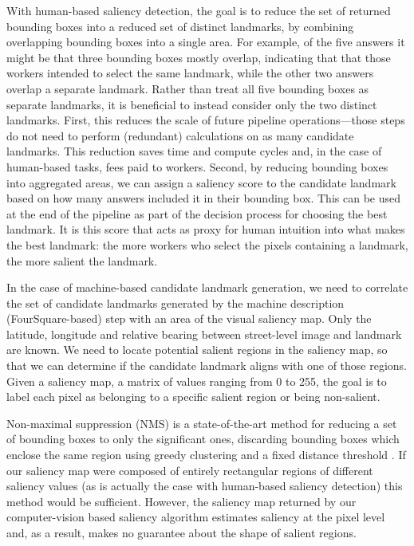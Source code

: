 With human-based saliency detection, the goal is to reduce the set of returned bounding boxes into a reduced set of distinct landmarks, by combining overlapping bounding boxes into a single area. For example, of the five answers it might be that three bounding boxes mostly overlap, indicating that that those workers intended to select the same landmark, while the other two answers overlap a separate landmark. Rather than treat all five bounding boxes as separate landmarks, it is beneficial to instead consider only the two distinct landmarks. First, this reduces the scale of future pipeline operations---those steps do not need to perform (redundant) calculations on as many candidate landmarks. This reduction saves time and compute cycles and, in the case of human-based tasks, fees paid to workers. Second, by reducing bounding boxes into aggregated areas, we can assign a saliency score to the candidate landmark based on how many answers included it in their bounding box. This can be used at the end of the pipeline as part of the decision process for choosing the best landmark. It is this score that acts as proxy for human intuition into what makes the best landmark: the more workers who select the pixels containing a landmark, the more salient the landmark.

In the case of machine-based candidate landmark generation, we need to correlate the set of candidate landmarks generated by the machine description (FourSquare-based) step with an area of the visual saliency map. Only the latitude, longitude and relative bearing between street-level image and landmark are known. We need to locate potential salient regions in the saliency map, so that we can determine if the candidate landmark aligns with one of those regions. 
Given a saliency map, a matrix of values ranging from 0 to 255, the goal is to label each pixel as belonging to a specific salient region or being non-salient. 

Non-maximal suppression (NMS) is a state-of-the-art method for reducing a set of bounding boxes to only the significant ones, discarding bounding boxes which enclose the same region using greedy clustering and a fixed distance threshold \cite{neubeck2006efficient}. If our saliency map were composed of entirely rectangular regions of different saliency values (as is actually the case with human-based saliency detection) this method would be sufficient. However, the saliency map returned by our computer-vision based saliency algorithm estimates saliency at the pixel level and, as a result, makes no guarantee about the shape of salient regions.

